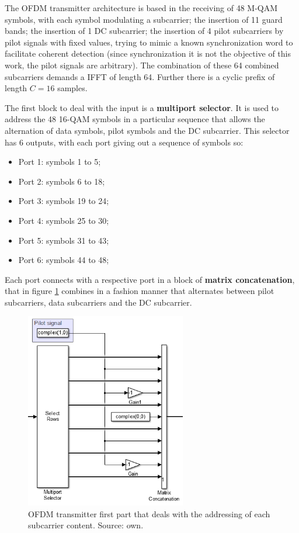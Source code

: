 The OFDM transmitter architecture is based in the receiving of 48 M-QAM symbols, with each symbol modulating a subcarrier; the insertion of 11 guard bands; the insertion of 1 DC subcarrier; the insertion of 4 pilot subcarriers by pilot signals with fixed values, trying to mimic a known synchronization word to facilitate coherent detection (since synchronization it is not the objective of this work, the pilot signals are arbitrary). The combination of these 64 combined subcarriers demands a IFFT of length 64. Further there is a cyclic prefix of length $C=16$ samples.

The first block to deal with the input is a \textbf{multiport selector}. It is used to address the 48 16-QAM symbols in a particular sequence that allows the alternation of data symbols, pilot symbols and the DC subcarrier. This selector has 6 outputs, with each port giving out a sequence of symbols so:

\begin{itemize}
    \item Port 1: symbols 1 to 5;
    \item Port 2: symbols 6 to 18;
    \item Port 3: symbols 19 to 24;
    \item Port 4: symbols 25 to 30;
    \item Port 5: symbols 31 to 43;
    \item Port 6: symbols 44 to 48;    
\end{itemize}

Each port connects with a respective port in a block of \textbf{matrix concatenation}, that in figure \ref{fig:ofdm:1} combines in a fashion manner that alternates between pilot subcarriers, data subcarriers and the DC subcarrier.

\begin{figure}[h]
\begin{center}
\includegraphics[width=7cm]{images/TX1.png}
\caption{OFDM transmitter first part that deals with the addressing of each subcarrier content. Source: own.}
\label{fig:ofdm:1} 
\end{center}
\end{figure}

